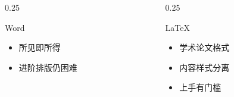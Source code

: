 \begin{frame}
\begin{columns}[t]
\begin{column}{0.25\textwidth}
\begin{exampleblock}{Word}
\begin{itemize}
          \item[\faPlus] 所见即所得

          \item[\faMinus] 进阶排版仍困难

        \end{itemize}

      \end{exampleblock}


    \end{column}

    \begin{column}{0.25\textwidth}

      \begin{exampleblock}{\LaTeX{}}

        \begin{itemize}

          \item[\faPlus] 学术论文格式

          \item[\faPlus] 内容样式分离

          \item[\faMinus] 上手有门槛

        \end{itemize}

      \end{exampleblock}

\end{column}
\end{columns}
\end{frame}
